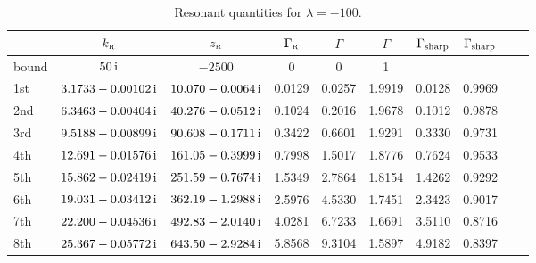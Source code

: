 \documentclass[12pt]{article}
\newcommand{\rmi}{{\rm i}}
\newcommand{\zr}{z_{\text{\tiny R}}}
\newcommand{\gr}{\Gamma _{\text{\tiny R}}}
\newcommand{\kr}{k_{\text{\tiny R}}}
\begin{document}
\begin{table}[H]
\centering
\vspace{6pt}
\begin{tabular}{|l| c| c| c| c | c | c | c|c|c|} %
\hline\hline
      & $\kr$ & $\zr$ & $\gr$ & $\overline{\Gamma}$ & $\Gamma$ & 
$\overline{\Gamma}_{\rm sharp}$
& $\Gamma_{\rm sharp}$   \\
\hline


bound &  $50 \, \rmi$ &  $-2500$ & 
0 & 0 & 1 &  &    \\

1st & $3.1733 -0.00102 \, \rmi$ & $10.070 -0.0064 \, \rmi$ & 
0.0129 & 0.0257 & 1.9919 & 0.0128 & 0.9969  \\

2nd & $6.3463 -0.00404 \, \rmi$ & $40.276 -0.0512 \, \rmi$ & 
0.1024 & 0.2016 & 1.9678 & 0.1012 & 0.9878  \\

3rd & $9.5188 -0.00899 \, \rmi$ & $90.608 -0.1711 \, \rmi$ & 
0.3422 & 0.6601 & 1.9291 & 0.3330 & 0.9731  \\

4th & $12.691 -0.01576 \, \rmi$ & $161.05 -0.3999 \, \rmi$ & 
0.7998 & 1.5017 & 1.8776 & 0.7624 & 0.9533  \\

5th & $15.862 -0.02419 \, \rmi$ & $251.59 -0.7674 \, \rmi$ & 
1.5349 & 2.7864 & 1.8154 & 1.4262 & 0.9292  \\

6th & $19.031 -0.03412 \, \rmi$ & $362.19 -1.2988 \, \rmi$ & 
2.5976 & 4.5330 & 1.7451 & 2.3423 & 0.9017  \\

7th & $22.200 -0.04536 \, \rmi$ & $492.83 -2.0140 \, \rmi$ & 
4.0281 & 6.7233 & 1.6691 & 3.5110 & 0.8716  \\

8th & $25.367 -0.05772 \, \rmi$ & $643.50 -2.9284 \, \rmi$ & 
5.8568 & 9.3104 & 1.5897 & 4.9182 & 0.8397  \\



\hline\hline 
\end{tabular}
\caption{Resonant quantities for $\lambda =-100$.}
\label{table:-100}
\end{table}





\newpage
\end{document}
